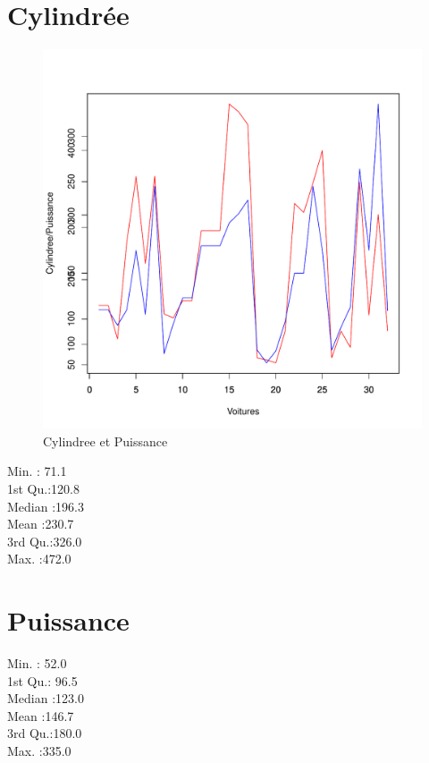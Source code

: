 \documentclass[a4]{article}
\begin{document}
\section{Cylindrée}
\begin{figure}[h]
\includegraphics[scale=0.5]{graphicB.pdf}
\caption{Cylindree et Puissance}
\end{figure}
    
Min.   : 71.1\\
1st Qu.:120.8\\
 Median :196.3\\ 
Mean   :230.7\\
3rd Qu.:326.0\\
 Max.   :472.0\\

\section{Puissance}
     
Min.   : 52.0\\
1st Qu.: 96.5\\
Median :123.0\\
Mean   :146.7\\
3rd Qu.:180.0\\
Max.   :335.0\\
\end{document}
